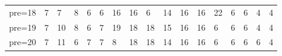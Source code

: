 \documentclass[11pt]{article}
\begin{document}
\begin{tabular}{lllllllllllllllll}
	 pre=18      & 7           & 7           & 8           & 6           & 6           & 16          & 16          & 6           & 14          & 16          & 16          & 22          & 6           & 6           & 4           & 4          \\
	 pre=19      & 7           & 10          & 8           & 6           & 7           & 19          & 18          & 18          & 15          & 16          & 16          & 6           & 6           & 6           & 4           & 4          \\
	 pre=20      & 7           & 11          & 6           & 7           & 7           & 8           & 18          & 18          & 14          & 16          & 16          & 6           & 6           & 6           & 6           & 4          \\
\end{tabular}


    

    
    
    
    
\end{document}
